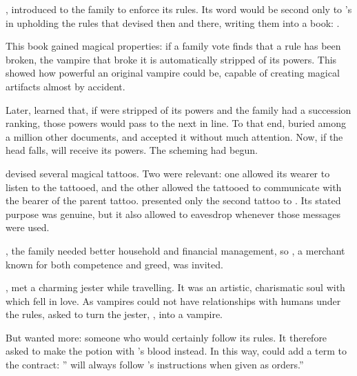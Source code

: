,  introduced  to the family to enforce its rules. Its word would be second only to 's in upholding the rules that  devised then and there, writing them into a book: .

This book gained magical properties: if a family vote finds that a rule has been broken, the vampire that broke it is automatically stripped of its powers. This showed  how powerful an original vampire could be, capable of creating magical artifacts almost by accident.

Later,  learned that, if  were stripped of its powers and the family had a succession ranking, those powers would pass to the next in line. To that end,  buried  among a million other documents, and  accepted it without much attention. Now, if the head falls,  will receive its powers. The scheming had begun.


 devised several magical tattoos. Two were relevant: one allowed its wearer to listen to the tattooed, and the other allowed the tattooed to communicate with the bearer of the parent tattoo.  presented only the second tattoo to . Its stated purpose was genuine, but it also allowed  to eavesdrop whenever those messages were used.


, the family needed better household and financial management, so , a merchant known for both competence and greed, was invited.

,  met a charming jester while travelling. It was an artistic, charismatic soul with which  fell in love. As vampires could not have relationships with humans under the rules,  asked  to turn the jester, , into a vampire.

But  wanted more: someone who would certainly follow its rules. It therefore asked  to make the potion with 's blood instead. In this way,  could add a term to the contract: '' will always follow 's instructions when given as orders.''

